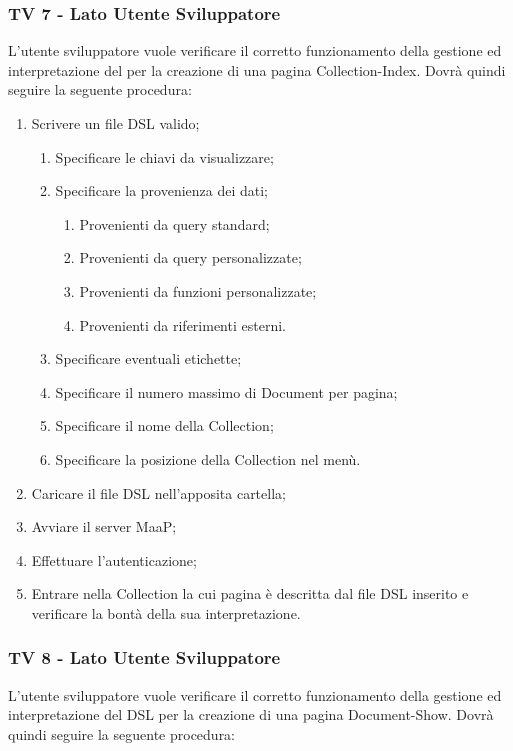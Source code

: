 \subsubsection{TV 7 - Lato Utente Sviluppatore}

L'utente sviluppatore vuole verificare il corretto funzionamento della gestione ed interpretazione del  per la creazione di una pagina Collection-Index.
Dovrà quindi seguire la seguente procedura:

\begin{enumerate}
\item Scrivere un file DSL valido;
\begin{enumerate}
\item Specificare le chiavi da visualizzare;
\item Specificare la provenienza dei dati;
\begin{enumerate}
\item Provenienti da query standard;
\item Provenienti da query personalizzate;
\item Provenienti da funzioni personalizzate;
\item Provenienti da riferimenti esterni.
\end{enumerate}
\item Specificare eventuali etichette;
\item Specificare il numero massimo di Document per pagina;
\item Specificare il nome della Collection;
\item Specificare la posizione della Collection nel menù.
\end{enumerate}
\item Caricare il file DSL nell'apposita cartella;
\item Avviare il server MaaP;
\item Effettuare l'autenticazione;
\item Entrare nella Collection la cui pagina è descritta dal file DSL inserito e verificare la bontà della sua interpretazione.
\end{enumerate}


\subsubsection{TV 8 - Lato Utente Sviluppatore}

L’utente sviluppatore vuole verificare il corretto funzionamento della gestione ed interpretazione del DSL per la creazione di una pagina Document-Show.
Dovrà quindi seguire la seguente procedura:

